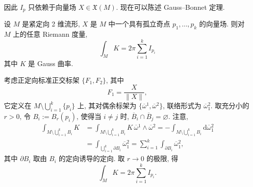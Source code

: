 因此 $I_p$ 只依赖于向量场 $X\in\mathfrak{X}(M)$. 现在可以陈述 Gauss–Bonnet 定理.

\begin{RiemannTheorem}\label{thm:gauss-bonnet}
设 $M$ 是紧定向 2 维流形, $X$ 是 $M$ 中一个具有孤立奇点 $p_1,\ldots,p_k$ 的向量场. 则对 $M$ 上的任意 Riemann 度量,
\begin{equation}\label{eq:gauss-bonnet-index-formula}
  \int_M K=2\pi\sum_{i=1}^k I_{p_i}
\end{equation}
其中 $K$ 是 Gauss 曲率.
\end{RiemannTheorem}

\begin{RiemannProof}
考虑正定向标准正交标架 $\{F_1,F_2\}$, 其中
\[
  F_1=\frac{X}{\lVert X\rVert},
\]
它定义在 $M\setminus\bigcup_{i=1}^k\{p_i\}$ 上, 其对偶余标架为 $\{\overline\omega{}^1,\overline\omega{}^2\}$, 联络形式为 $\overline\omega{}_1^2$. 取充分小的 $r>0$, 令 $B_i:=B_r(p_i)$, 使得当 $i\ne j$ 时, $\overline B_i\cap\overline B_j=\varnothing$. 注意,
\begin{align*}
  \int_{M\setminus\bigcup_{i=1}^k B_i}K
  &=\int_{M\setminus\bigcup_{i=1}^k B_i}K\,\overline\omega{}^1\wedge\overline\omega{}^2
  =-\int_{M\setminus\bigcup_{i=1}^k B_i}\mathrm{d}\overline\omega{}_1^2\\
  &=\int_{\bigcup_{i=1}^k\partial B_i}\overline\omega{}_1^2
  =\sum_{i=1}^k\int_{\partial B_i}\overline\omega{}_1^2,
\end{align*}
其中 $\partial B_i$ 取由 $B_i$ 的定向诱导的定向. 取 $r\to0$ 的极限, 得
\[
  \int_M K=2\pi\sum_{i=1}^k I_{p_i}.
\]
\end{RiemannProof}

